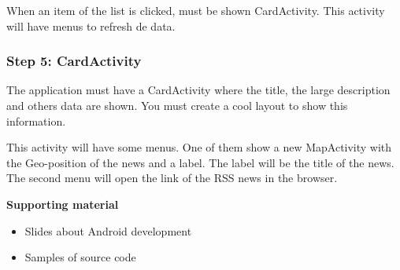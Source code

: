 \documentclass[a4paper]{article}
\begin{document}
When an item of the list is clicked, must be shown  CardActivity. This
activity will have menus to refresh de data.

\subsubsection{Step 5: CardActivity}

The application must have a CardActivity where the title, the large
description and others data are shown. You must create a cool layout
to show this information.

This activity will have some menus. One of them show a new MapActivity
with the Geo-position of the news and a label. The label will be the
title of the news. The second menu will open the link of the RSS news
in the browser.

\vspace{0.4cm}

\textbf{Supporting material}

\begin{itemize}
\item Slides about Android development
\item Samples of source code
\end{itemize}


\end{document}
